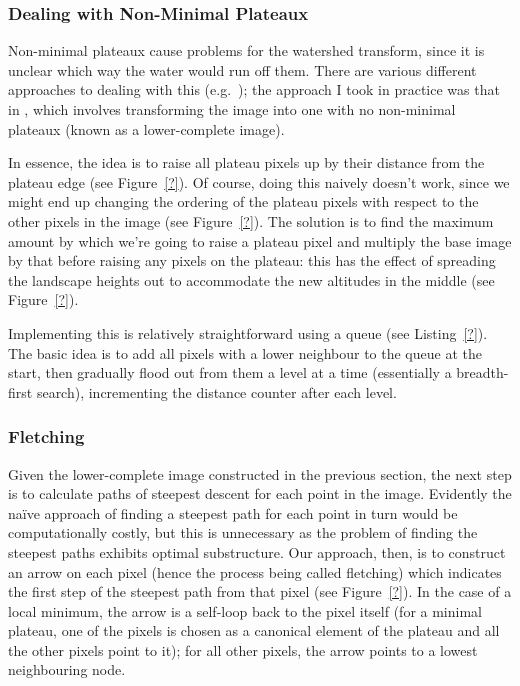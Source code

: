 
\subsubsection{Dealing with Non-Minimal Plateaux}

Non-minimal plateaux cause problems for the watershed transform, since it is unclear which way the water would run off them. There are various different approaches to dealing with this (e.g.~\cite{?,?,?}); the approach I took in practice was that in \cite{meijster98}, which involves transforming the image into one with no non-minimal plateaux (known as a lower-complete image).

In essence, the idea is to raise all plateau pixels up by their distance from the plateau edge (see Figure~\ref{?}). Of course, doing this naively doesn't work, since we might end up changing the ordering of the plateau pixels with respect to the other pixels in the image (see Figure~\ref{?}). The solution is to find the maximum amount by which we're going to raise a plateau pixel and multiply the base image by that before raising any pixels on the plateau: this has the effect of spreading the landscape heights out to accommodate the new altitudes in the middle (see Figure~\ref{?}).


Implementing this is relatively straightforward using a queue (see Listing~\ref{?}). The basic idea is to add all pixels with a lower neighbour to the queue at the start, then gradually flood out from them a level at a time (essentially a breadth-first search), incrementing the distance counter after each level.

\subsubsection{Fletching}

Given the lower-complete image constructed in the previous section, the next step is to calculate paths of steepest descent for each point in the image. Evidently the na\"ive approach of finding a steepest path for each point in turn would be computationally costly, but this is unnecessary as the problem of finding the steepest paths exhibits optimal substructure. Our approach, then, is to construct an arrow on each pixel (hence the process being called fletching) which indicates the first step of the steepest path from that pixel (see Figure~\ref{?}). In the case of a local minimum, the arrow is a self-loop back to the pixel itself (for a minimal plateau, one of the pixels is chosen as a canonical element of the plateau and all the other pixels point to it); for all other pixels, the arrow points to a lowest neighbouring node.

